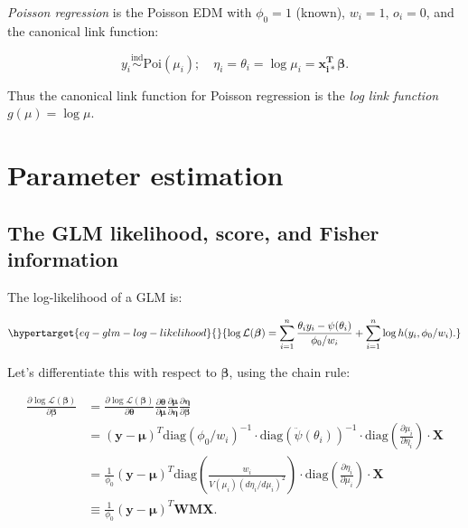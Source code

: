 \documentclass[
  11pt,
  letterpaper,
  oneside]{book}
\theoremstyle{definition}
\theoremstyle{plain}
\theoremstyle{plain}
\theoremstyle{plain}
\theoremstyle{remark}
\begin{document}
\emph{Poisson regression} is the Poisson EDM with \(\phi_0 = 1\)
(known), \(w_i = 1\), \(o_i = 0\), and the canonical link function:

\[
y_i \overset{\text{ind}}\sim \text{Poi}(\mu_i); \quad \eta_i = \theta_i = \log \mu_i = \boldsymbol{x_{i*}^T} \boldsymbol{\beta}.
\]

Thus the canonical link function for Poisson regression is the \emph{log
link function} \(g(\mu) = \log \mu\).

\hypertarget{sec-glm-max-lik}{%
\chapter{Parameter estimation}\label{sec-glm-max-lik}}

\hypertarget{sec-glm-likelihood}{%
\section{The GLM likelihood, score, and Fisher
information}\label{sec-glm-likelihood}}

The log-likelihood of a GLM is:

\begin{equation}\protect\hypertarget{eq-glm-log-likelihood}{}{
\log \mathcal L(\boldsymbol{\beta}) = \sum_{i = 1}^n \frac{\theta_i y_i - \psi(\theta_i)}{\phi_0/w_i} + \sum_{i = 1}^n \log h(y_i, \phi_0/w_i).
}\label{eq-glm-log-likelihood}\end{equation}

Let's differentiate this with respect to \(\boldsymbol{\beta}\), using
the chain rule:

\[
\begin{split}
  \frac{\partial \log \mathcal L(\boldsymbol{\beta})}{\partial \boldsymbol{\beta}} &= \frac{\partial \log \mathcal L(\boldsymbol{\beta})}{\partial \boldsymbol{\theta}}\frac{\partial \boldsymbol{\theta}}{\partial \boldsymbol{\mu}} \frac{\partial \boldsymbol{\mu}}{\partial \boldsymbol{\eta}}\frac{\partial \boldsymbol{\eta}}{\partial \boldsymbol{\beta}} \\
  &=  (\boldsymbol{y} - \boldsymbol{\mu})^T \text{diag}(\phi_0/w_i)^{-1} \cdot \text{diag}(\ddot{\psi}(\theta_i))^{-1} \cdot \text{diag}\left(\frac{\partial\mu_i}{\partial \eta_i}\right) \cdot \boldsymbol{X}\\
  &= \frac{1}{\phi_0}(\boldsymbol{y} - \boldsymbol{\mu})^T \text{diag}\left(\frac{w_i}{V(\mu_i)(d\eta_i/d\mu_i)^2}\right)\cdot \text{diag}\left(\frac{\partial\eta_i}{\partial \mu_i}\right) \cdot \boldsymbol{X} \\
  &\equiv \frac{1}{\phi_0}(\boldsymbol{y} - \boldsymbol{\mu})^T \boldsymbol{W} \boldsymbol{M} \boldsymbol{X}.
\end{split}
\]
\end{document}
